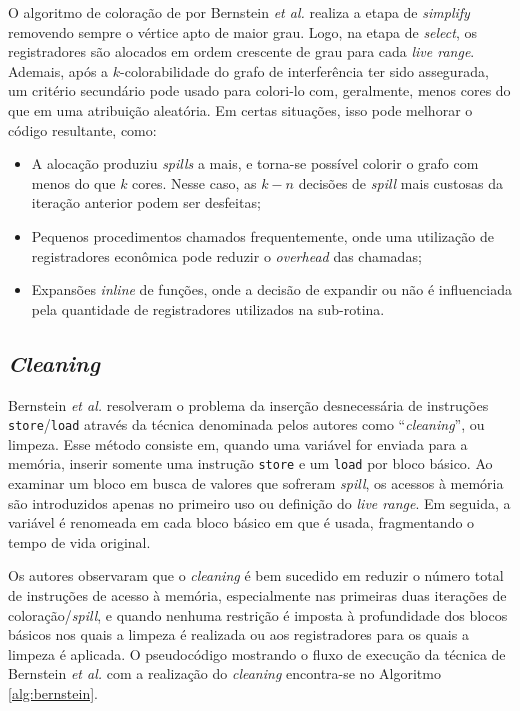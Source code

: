 \documentclass[
	12pt,				%
	openright,			%
	oneside,			%
	a4paper,			%
	tccpreliminar,			%
	]{ABNT-DC-UEL}
\begin{document}
O algoritmo de coloração de por Bernstein \textit{et al.} realiza a etapa de \textit{simplify} removendo sempre o vértice apto de maior grau. Logo, na etapa de \textit{select}, os registradores são alocados em ordem crescente de grau para cada \textit{live range}. Ademais, após a $k$-colorabilidade do grafo de interferência ter sido assegurada, um critério secundário pode usado para colori-lo com, geralmente, menos cores do que em uma atribuição aleatória. Em certas situações, isso pode melhorar o código resultante, como:

\begin{itemize}
    \item A alocação produziu \textit{spills} a mais, e torna-se possível colorir o grafo com menos do que $k$ cores. Nesse caso, as $k - n$ decisões de \textit{spill} mais custosas da iteração anterior podem ser desfeitas;
    \item Pequenos procedimentos chamados frequentemente, onde uma utilização de registradores econômica pode reduzir o \textit{overhead} das chamadas;
    \item Expansões \textit{inline} de funções, onde a decisão de expandir ou não é influenciada pela quantidade de registradores utilizados na sub-rotina.
\end{itemize}

\subsection{\textit{Cleaning}}

Bernstein \textit{et al.} \cite{bernstein:89} resolveram o problema da inserção desnecessária de instruções \texttt{store}/\texttt{load} através da técnica denominada pelos autores como ``\textit{cleaning}'', ou limpeza. Esse método consiste em, quando uma variável for enviada para a memória, inserir somente uma instrução \texttt{store} e um \texttt{load} por bloco básico. Ao examinar um bloco em busca de valores que sofreram \textit{spill}, os acessos à memória são introduzidos apenas no primeiro uso ou definição do \textit{live range}. Em seguida, a variável é renomeada em cada bloco básico em que é usada, fragmentando o tempo de vida original.

Os autores observaram que o \textit{cleaning} é bem sucedido em reduzir o número total de instruções de acesso à memória, especialmente nas primeiras duas iterações de coloração/\textit{spill}, e quando nenhuma restrição é imposta à profundidade dos blocos básicos nos quais a limpeza é realizada ou aos registradores para os quais a limpeza é aplicada. O pseudocódigo mostrando o fluxo de execução da técnica de Bernstein \textit{et al.} com a realização do \textit{cleaning} encontra-se no Algoritmo \ref{alg:bernstein}.
\end{document}
